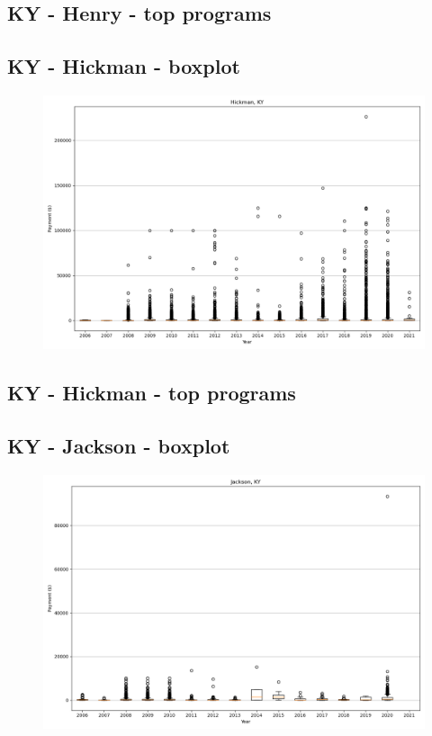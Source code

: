 \subsection*{KY - Henry - top programs}

\newpage
\subsection*{KY - Hickman - boxplot}
\begin{figure}[h]
\centering
\includegraphics[width=7in]{../output/boxplots/counties/Hickman-KY_boxplot.png}
\end{figure}


\subsection*{KY - Hickman - top programs}

\newpage
\subsection*{KY - Jackson - boxplot}
\begin{figure}[h]
\centering
\includegraphics[width=7in]{../output/boxplots/counties/Jackson-KY_boxplot.png}
\end{figure}


